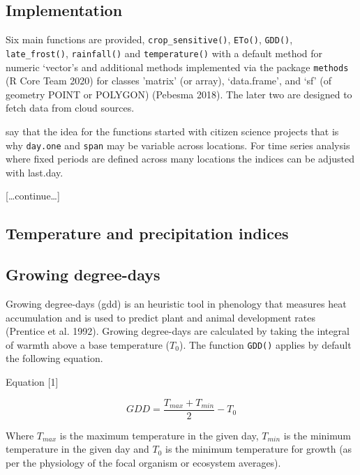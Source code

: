 \documentclass[
]{article}
\begin{document}
\hypertarget{implementation}{%
\subsection{Implementation}\label{implementation}}

Six main functions are provided, \texttt{crop\_sensitive()},
\texttt{ETo()}, \texttt{GDD()}, \texttt{late\_frost()},
\texttt{rainfall()} and \texttt{temperature()} with a default method for
numeric `vector's and additional methods implemented via the package
\texttt{methods} (R Core Team 2020) for classes 'matrix' (or array),
`data.frame', and `sf' (of geometry POINT or POLYGON) (Pebesma 2018).
The later two are designed to fetch data from cloud sources.

say that the idea for the functions started with citizen science
projects that is why \texttt{day.one} and \texttt{span} may be variable
across locations. For time series analysis where fixed periods are
defined across many locations the indices can be adjusted with last.day.

{[}\ldots continue\ldots{]}

\hypertarget{temperature-and-precipitation-indices}{%
\subsection{Temperature and precipitation
indices}\label{temperature-and-precipitation-indices}}

\hypertarget{growing-degree-days}{%
\subsection{Growing degree-days}\label{growing-degree-days}}

Growing degree-days (gdd) is an heuristic tool in phenology that
measures heat accumulation and is used to predict plant and animal
development rates (Prentice et al. 1992). Growing degree-days are
calculated by taking the integral of warmth above a base temperature
(\(T_{0}\)). The function \texttt{GDD()} applies by default the
following equation.

Equation {[}1{]}

\[GDD = \frac{T_{max} + T_{min}}{2} - T_{0}\]

Where \(T_{max}\) is the maximum temperature in the given day,
\(T_{min}\) is the minimum temperature in the given day and \(T_{0}\) is
the minimum temperature for growth (as per the physiology of the focal
organism or ecosystem averages).
\end{document}
